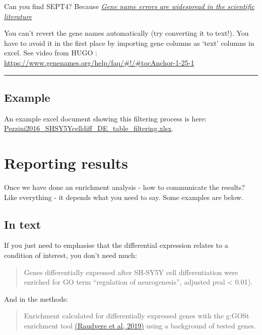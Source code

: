 \documentclass[
]{book}
\begin{document}
Can you find SEPT4? Because \href{https://genomebiology.biomedcentral.com/articles/10.1186/s13059-016-1044-7}{\emph{Gene name errors are widespread in the scientific literature}}

You can't revert the gene names automatically (try converting it to text!). You have to avoid it in the first place by importing gene columns as `text' columns in excel. See video from HUGO : \url{https://www.genenames.org/help/faq/\#!/\#tocAnchor-1-25-1}

\begin{center}\rule{0.5\linewidth}{0.5pt}\end{center}

\section{Example}\label{example}

An example excel document showing this filtering process is here: \href{https://monashbioinformaticsplatform.github.io/enrichment_analysis_workshop/data/Pezzini2016_SHSY5Ycelldiff_DE_table_filtering.xlsx}{Pezzini2016\_SHSY5Ycelldiff\_DE\_table\_filtering.xlsx}.

\chapter{Reporting results}\label{reporting-results}

Once we have done an enrichment analysis - how to communicate the results? Like everything - it depends what you need to say. Some examples are below.

\section{In text}\label{in-text}

If you just need to emphasise that the differential expression relates to a condition of interest, you don't need much:

\begin{quote}
Genes differentially expressed after SH-SY5Y cell differentiation were enriched for GO term ``regulation of neurogenesis'', adjusted pval \textless{} 0.01).
\end{quote}

And in the methods:

\begin{quote}
Enrichment calculated for differentially expressed genes with the g:GOSt enrichment tool \href{https://academic.oup.com/nar/article/47/W1/W191/5486750}{(Raudvere et al, 2019)} using a background of tested genes.
\end{quote}
\end{document}
